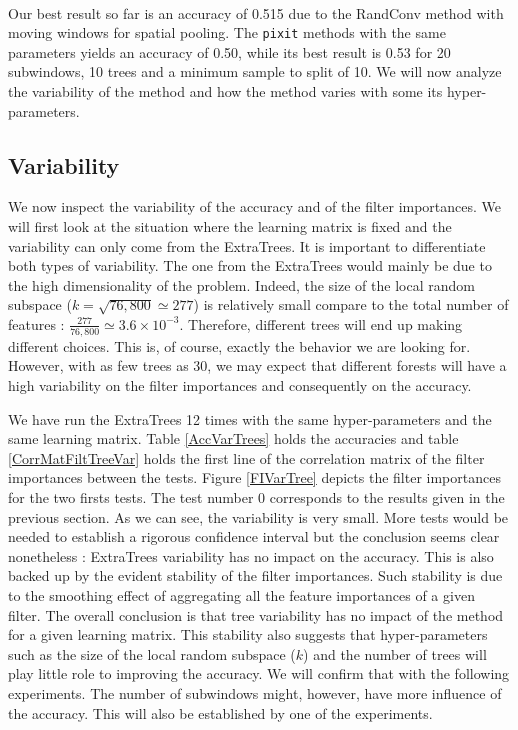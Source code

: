 \documentclass[a4paper]{report}
\begin{document}
		\paragraph{}
		Our best result so far is an accuracy of 0.515 due to the RandConv method with moving windows for spatial pooling. The \texttt{pixit} methods with the same parameters yields an accuracy of 0.50, while its best result is 0.53 for 20 subwindows, 10 trees and a minimum sample to split of 10. We will now analyze the variability of the method and how the method varies with some its hyper-parameters.
		
		\subsection{\label{subsec:ETDICVariability}Variability}
		We now inspect the variability of the accuracy and of the filter importances. We will first look at the situation where the learning matrix is fixed and the variability can only come from the ExtraTrees. It is important to differentiate both types of variability. The one from the ExtraTrees would mainly be due to the high dimensionality of the problem. Indeed, the size of the local random subspace ($k = \sqrt{76,800} \simeq 277$) is relatively small compare to the total number of features : $\frac{277}{76,800} \simeq 3.6 \times 10^{-3}$. Therefore, different trees will end up making different choices. This is, of course, exactly the behavior we are looking for. However, with as few trees as 30, we may expect that different forests will have a high variability on the filter importances and consequently on the accuracy.
		\par
		We have run the ExtraTrees 12 times with the same hyper-parameters and the same learning matrix. Table \ref{AccVarTrees} holds the accuracies and table \ref{CorrMatFiltTreeVar} holds the first line of the correlation matrix of the filter importances between the tests. Figure \ref{FIVarTree} depicts the filter importances for the two firsts tests. The test number 0 corresponds to the results given in the previous section. As we can see, the variability is very small. More tests would be needed to establish a rigorous confidence interval but the conclusion seems clear nonetheless : ExtraTrees variability has no impact on the accuracy. This is also backed up by the evident stability of the filter importances. Such stability is due to the smoothing effect of aggregating all the feature importances of a given filter. The overall conclusion is that tree variability has no impact of the method for a given learning matrix. This stability also suggests that hyper-parameters such as the size of the local random subspace ($k$) and the number of trees will play little role to improving the accuracy. We will confirm that with the following experiments. The number of subwindows might, however, have more influence of the accuracy. This will also be established by one of the experiments.
\end{document}
